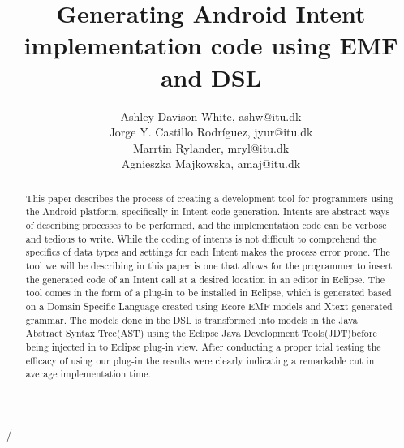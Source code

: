 \documentclass[10pt]{article}
\title{Generating Android Intent implementation code using EMF and DSL}
\author{Ashley Davison-White, ashw@itu.dk 
        \\Jorge Y. Castillo Rodríguez, jyur@itu.dk
        \\Marrtin Rylander, mryl@itu.dk
        \\Agnieszka Majkowska, amaj@itu.dk
}
\begin{document}
\maketitle

\begin{abstract}
This paper describes the process of creating a development tool for programmers using the Android platform, specifically in Intent code generation.
Intents are abstract ways of describing processes to be performed, and the implementation code can be verbose and tedious to write. While the coding of intents is not difficult to comprehend the specifics of data types and settings for each Intent makes the process error prone. The tool we will be describing in this paper is one that allows for the programmer to insert the generated code of an Intent call at a desired location in an editor in Eclipse.
The tool comes in the form of a plug-in to be installed in Eclipse, which is generated based on a Domain Specific Language created using Ecore EMF models and Xtext generated grammar.
The models done in the DSL is transformed into models in the Java Abstract Syntax Tree(AST) using the Eclipse Java Development Tools(JDT)before being injected in to Eclipse plug-in view.
After conducting a proper trial testing the efficacy of using our plug-in the results were clearly indicating a remarkable cut in average implementation time.    
\end{abstract}






















/%
\end{document}
